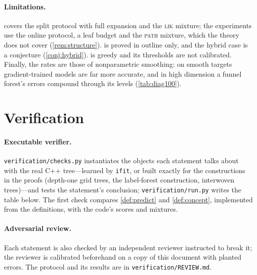\documentclass[11pt]{article}
\theoremstyle{definition}
\theoremstyle{remark}
\begin{document}
\paragraph{Limitations.}
 covers the split protocol with full expansion and the \textsc{lik}
mixture; the experiments use the online protocol, a leaf budget and the \textsc{path}
mixture, which the theory does not cover (\cref{rem:structure}).   is
proved in outline only, and the hybrid case is a conjecture (\cref{conj:hybrid}).
 is greedy and its thresholds are not calibrated.  Finally, the
rates are those of nonparametric smoothing: on smooth targets gradient-trained models
are far more accurate, and in high dimension a funnel forest's errors compound through
its levels (\cref{tab:diag100}).

\appendix
\section{Verification}\label{app:verify}

\paragraph{Executable verifier.}
\texttt{verification/checks.py} instantiates the objects each statement talks about with
the real C++ tree---learned by \texttt{ifit}, or built exactly for the constructions in
the proofs (depth-one grid trees, the label-forest construction, interwoven trees)---and
tests the statement's conclusion; \texttt{verification/run.py} writes the table below.
The first check compares \cref{def:predict} and \cref{def:concept}, implemented from the
definitions, with the code's scores and mixtures.


\paragraph{Adversarial review.}
Each statement is also checked by an independent reviewer instructed to break it; the
reviewer is calibrated beforehand on a copy of this document with planted errors.  The
protocol and its results are in \texttt{verification/REVIEW.md}.



\end{document}
